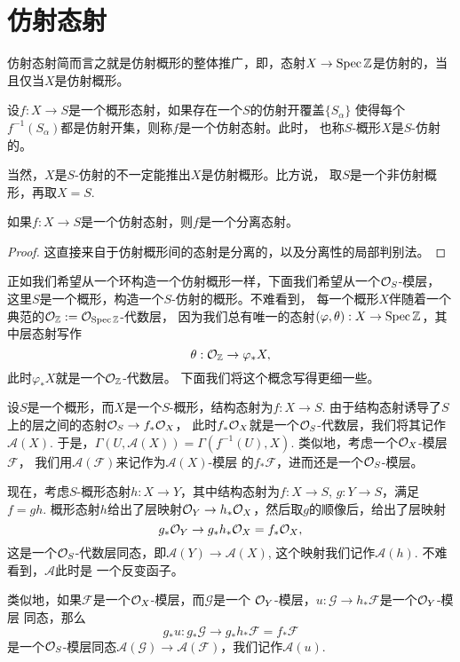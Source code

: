 \section{仿射态射}

仿射态射简而言之就是仿射概形的整体推广，即，态射$X\to \operatorname{Spec} \mathbb{Z}$是仿射的，当且仅当$X$是仿射概形。

\begin{para}[仿射态射]
设$f:X\to S$是一个概形态射，如果存在一个$S$的仿射开覆盖$\{S_\alpha\}$
使得每个$f^{-1}(S_\alpha)$都是仿射开集，则称$f$是一个仿射态射。此时，
也称$S$-概形$X$是$S$-仿射的。
\end{para}

当然，$X$是$S$-仿射的不一定能推出$X$是仿射概形。比方说，
取$S$是一个非仿射概形，再取$X=S$.

\begin{lem}
如果$f:X\to S$是一个仿射态射，则$f$是一个分离态射。
\end{lem}

\begin{proof}
这直接来自于仿射概形间的态射是分离的，以及分离性的局部判别法。
\end{proof}

正如我们希望从一个环构造一个仿射概形一样，下面我们希望从一个$\mathcal{O}_S$-模层，
这里$S$是一个概形，构造一个$S$-仿射的概形。不难看到，
每一个概形$X$伴随着一个典范的$\mathcal{O}_{\mathbb{Z}}:=\mathcal{O}_{\operatorname{Spec} \mathbb{Z}}$-代数层，
因为我们总有唯一的态射$(\varphi,\theta):X\to \operatorname{Spec} \mathbb{Z}$，其中层态射写作
\[
	\theta:\mathcal{O}_{\mathbb{Z}} \to \varphi_*X,
\]
此时$\varphi_* X$就是一个$\mathcal{O}_{\mathbb{Z}}$-代数层。
下面我们将这个概念写得更细一些。

\begin{para}
	设$S$是一个概形，而$X$是一个$S$-概形，结构态射为$f:X\to S$. 
	由于结构态射诱导了$S$上的层之间的态射$\mathcal{O}_S\to f_*\mathcal{O}_X$，
	此时$f_*\mathcal{O}_X$就是一个$\mathcal{O}_S$-代数层，我们将其记作
	$\mathcal A(X)$. 于是，$\Gamma(U,\mathcal A(X))=\Gamma(
	f^{-1}(U),X)$. 类似地，考虑一个$\mathcal{O}_X$-模层$\mathcal F$，
	我们用$\mathcal A(\mathcal F)$来记作为$\mathcal A(X)$-模层
	的$f_*\mathcal F$，进而还是一个$\mathcal{O}_S$-模层。

	现在，考虑$S$-概形态射$h:X\to Y$，其中结构态射为$f:X\to S$, 
	$g:Y\to S$，满足$f=gh$. 概形态射$h$给出了层映射$\mathcal{O}_Y\to
	h_*\mathcal{O}_X$，然后取$g$的顺像后，给出了层映射
	\[
		g_*\mathcal{O}_Y\to g_*h_*\mathcal{O}_X=f_*\mathcal{O}_X,
	\]
	这是一个$\mathcal{O}_S$-代数层同态，即$\mathcal A(Y)\to \mathcal A(X)$,
	这个映射我们记作$\mathcal A(h)$. 不难看到，$\mathcal A$此时是
	一个反变函子。

	类似地，如果$\mathcal F$是一个$\mathcal{O}_X$-模层，而$\mathcal G$是一个
	$\mathcal{O}_Y$-模层，$u:\mathcal G\to h_*\mathcal F$是一个$\mathcal{O}_Y$-模层
	同态，那么
	\[
		g_*u:g_*\mathcal G\to g_*h_*\mathcal F=f_*\mathcal F
	\]
	是一个$\mathcal{O}_S$-模层同态$\mathcal A(\mathcal G)\to \mathcal A
	(\mathcal F)$，我们记作$\mathcal A(u)$. 
\end{para}

